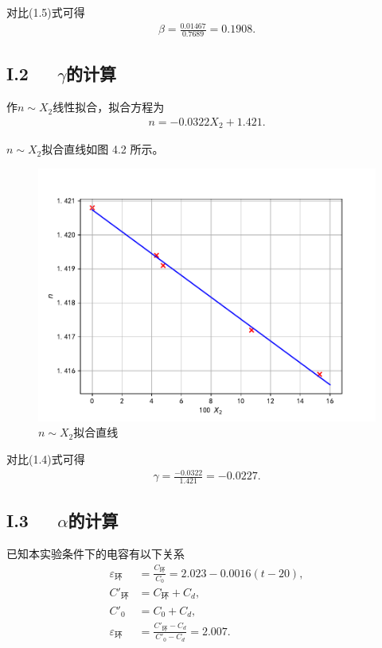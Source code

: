 \documentclass[12pt]{ctexart}
\numberwithin{equation}{section}
\begin{document}
对比(1.5)式可得
\begin{align}
    \beta = \frac{0.01467}{0.7689} = 0.1908.
    \tag{I.2}
\end{align}

\subsection*{I.2~~~$\gamma$的计算}

作$n \sim X_2$线性拟合，拟合方程为
\begin{align}
    n = -0.0322 X_2 + 1.421.
    \tag{I.3}
\end{align}

$n \sim X_2$拟合直线如图 4.2 所示。
\begin{figure}[!h]
    \centering
    \includegraphics[scale=0.7]{fitting_gamma.pdf}
    \caption{$n \sim X_2$拟合直线}
\end{figure}

对比(1.4)式可得
\begin{align}
    \gamma = \frac{-0.0322}{1.421} = -0.0227.
    \tag{I.4}
\end{align}

\subsection*{I.3~~~$\alpha$的计算}

已知本实验条件下的电容有以下关系
\begin{align}
    \varepsilon_\text{环} &= \frac{C_\text{环}}{C_0}
        = 2.023 - 0.0016(t - 20), \tag{I.5} \\
    C'_\text{环} &= C_\text{环} + C_d, \tag{I.6} \\
    C'_0 &= C_0 + C_d, \tag{I.7} \\
    \varepsilon_\text{环}
        &= \frac{C'_\text{环}-C_d}{C'_0 - C_d}
        = 2.007. \tag{I.8}
\end{align}
\end{document}
